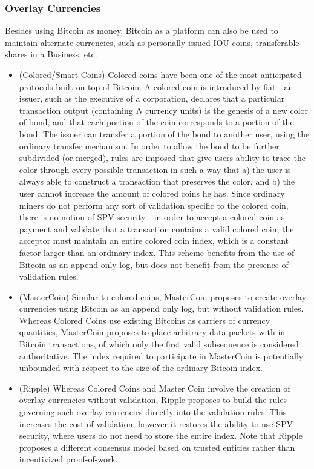 \subsubsection{Overlay Currencies}
Besides using Bitcoin as money, Bitcoin as a platform can also be used to maintain alternate currencies, such as personally-issued IOU coins, transferable shares in a Business, etc.
\begin{itemize}
\item (Colored/Smart Coins) Colored coins have been one of the most anticipated protocols built on top of Bitcoin. A colored coin is introduced by fiat - an issuer, such as the executive of a corporation, declares that a particular transaction output (containing $N$ currency units) is the genesis of a new color of bond, and that each portion of the coin corresponds to a portion of the bond. The issuer can transfer a portion of the bond to another user, using the ordinary transfer mechanism. In order to allow the bond to be further subdivided (or merged), rules are imposed that give users ability to trace the color through every possible transaction in such a way that a) the user is always able to construct a transaction that preserves the color, and b) the user cannot increase the amount of colored coins he has. Since ordinary miners do not perform any sort of validation specific to the colored coin, there is no notion of SPV security - in order to accept a colored coin as payment and validate that a transaction contains a valid colored coin, the acceptor must maintain an entire colored coin index, which is a constant factor larger than an ordinary index. This scheme benefits from the use of Bitcoin as an append-only log, but does not benefit from the presence of validation rules.
\item (MasterCoin) Similar to colored coins, MasterCoin proposes to create overlay currencies using Bitcoin as an append only log, but without validation rules. Whereas Colored Coins use existing Bitcoins as carriers of currency quantities, MasterCoin proposes to place arbitrary data packets with in Bitcoin transactions, of which only the first valid subsequence is considered authoritative. The index required to participate in MasterCoin is potentially unbounded with respect to the size of the ordinary Bitcoin index.
\item (Ripple) Whereas Colored Coins and Master Coin involve the creation of overlay currencies without validation, Ripple proposes to build the rules governing such overlay currencies directly into the validation rules. This increases the cost of validation, however it restores the ability to use SPV security, where users do not need to store the entire index. Note that Ripple proposes a different consensus model based on trusted entities rather than incentivized proof-of-work.
\end{itemize}

